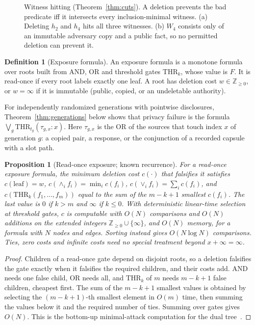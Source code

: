 \documentclass[pdflatex,sn-mathphys-num]{sn-jnl}%
\theoremstyle{plain}
\newtheorem{proposition}[theorem]{Proposition}
\theoremstyle{definition}
\newtheorem{definition}[theorem]{Definition}
\begin{document}
\begin{figure}[t]
\centering
\figbox{}
\caption{Witness hitting (Theorem~\ref{thm:cuts}). A deletion prevents the bad predicate iff it intersects every inclusion-minimal witness. (a) Deleting $h_2$ and $h_4$ hits all three witnesses. (b) $W_4$ consists only of an immutable adversary copy and a public fact, so no permitted deletion can prevent it.}\label{fig:witness}
\end{figure}

\begin{definition}[Exposure formula]
An exposure formula is a monotone formula over roots built from AND, OR and threshold gates $\mathrm{THR}_k$, whose value is $F$. It is read-once if every root labels exactly one leaf. A root has deletion cost $w\in\mathbb{Z}_{\ge0}$, or $w=\infty$ if it is immutable (public, copied, or an undeletable authority).
\end{definition}

For independently randomized generations with pointwise disclosures, Theorem~\ref{thm:generations} below shows that privacy failure is the formula $\bigvee_g\mathrm{THR}_{t_g}(\tau_{g,x}:x)$. Here $\tau_{g,x}$ is the OR of the sources that touch index $x$ of generation $g$: a copied pair, a response, or the conjunction of a recorded capsule with a slot path.

\begin{proposition}[Read-once exposure; known recurrence]\label{prop:readonce}
For a read-once exposure formula, the minimum deletion cost $c(\cdot)$ that falsifies it satisfies $c(\text{leaf})=w$, $c(\wedge_i f_i)=\min_i c(f_i)$, $c(\vee_i f_i)=\sum_i c(f_i)$, and $c(\mathrm{THR}_k(f_1,\dots,f_m))$ equal to the sum of the $m-k+1$ smallest $c(f_i)$. The last value is $0$ if $k>m$ and $\infty$ if $k\le0$. With deterministic linear-time selection~\cite{blum1973} at threshold gates, $c$ is computable with $O(N)$ comparisons and $O(N)$ additions on the extended integers $\mathbb{Z}_{\ge0}\cup\{\infty\}$, and $O(N)$ memory, for a formula with $N$ nodes and edges. Sorting instead gives $O(N\log N)$ comparisons. Ties, zero costs and infinite costs need no special treatment beyond $x+\infty=\infty$.
\end{proposition}
\begin{proof}
Children of a read-once gate depend on disjoint roots, so a deletion falsifies the gate exactly when it falsifies the required children, and their costs add. AND needs one false child, OR needs all, and $\mathrm{THR}_k$ of $m$ needs $m-k+1$ false children, cheapest first. The sum of the $m-k+1$ smallest values is obtained by selecting the $(m-k+1)$-th smallest element in $O(m)$ time, then summing the values below it and the required number of ties. Summing over gates gives $O(N)$. This is the bottom-up minimal-attack computation for the dual tree~\cite{mauw2005,lopuhaa2022}.
\end{proof}
\end{document}
